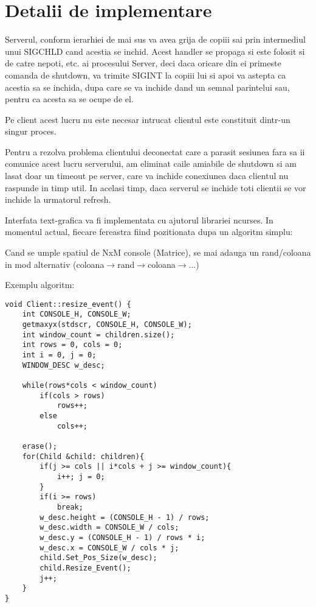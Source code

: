 \documentclass[runningheads]{llncs}
\begin{document}
\newpage
\section{Detalii de implementare}
Serverul, conform ierarhiei de mai sus va avea grija de copiii sai prin intermediul unui SIGCHLD cand acestia se inchid. Acest handler se propaga si este folosit si de catre nepoti, etc. ai procesului Server, deci daca oricare din ei primeste comanda de shutdown, va trimite SIGINT la copiii lui si apoi va astepta ca acestia sa se inchida, dupa care se va inchide dand un semnal parintelui sau, pentru ca acesta sa se ocupe de el.\newline

Pe client acest lucru nu este necesar intrucat clientul este constituit dintr-un singur proces.\newline

Pentru a rezolva problema clientului deconectat care a parasit sesiunea fara sa ii comunice acest lucru serverului, am eliminat caile amiabile de shutdown si am lasat doar un timeout pe server, care va inchide conexiunea daca clientul nu raspunde in timp util.\newline
In acelasi timp, daca serverul se inchide toti clientii se vor inchide la urmatorul refresh.\newline

\newpage

Interfata text-grafica va fi implementata cu ajutorul librariei ncurses. In momentul actual, fiecare fereastra fiind pozitionata dupa un algoritm simplu:\newline
\begin{center}Cand se umple spatiul de NxM console (Matrice), se mai adauga un rand/coloana in mod alternativ (coloana$\rightarrow$rand$\rightarrow$coloana$\rightarrow$...)
\end{center}

Exemplu algoritm:
\begin{lstlisting}
void Client::resize_event() {
    int CONSOLE_H, CONSOLE_W;
    getmaxyx(stdscr, CONSOLE_H, CONSOLE_W);
    int window_count = children.size();
    int rows = 0, cols = 0;
    int i = 0, j = 0;
    WINDOW_DESC w_desc;

    while(rows*cols < window_count)
        if(cols > rows)
            rows++;
        else
            cols++;

    erase();
    for(Child &child: children){
        if(j >= cols || i*cols + j >= window_count){
            i++; j = 0;
        }
        if(i >= rows)
            break;
        w_desc.height = (CONSOLE_H - 1) / rows;
        w_desc.width = CONSOLE_W / cols;
        w_desc.y = (CONSOLE_H - 1) / rows * i;
        w_desc.x = CONSOLE_W / cols * j;
        child.Set_Pos_Size(w_desc);
        child.Resize_Event();
        j++;
    }
}
\end{lstlisting}
\end{document}
